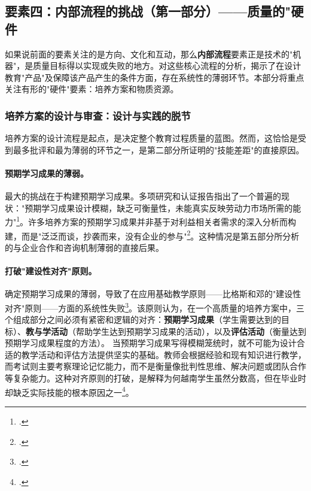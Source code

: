 


\subsection{要素四：内部流程的挑战（第一部分）——质量的"硬件}
\label{subsec:thach_thuc_quytringnoibo_hard}

如果说前面的要素关注的是方向、文化和互动，那么\textbf{内部流程}要素正是技术的"机器"，是质量目标得以实现或失败的地方。对这些核心流程的分析，揭示了在设计教育"产品"及保障该产品产生的条件方面，存在系统性的薄弱环节。本部分将重点关注有形的"硬件"要素：培养方案和物质资源。

\subsubsection{培养方案的设计与审查：设计与实践的脱节}

培养方案的设计流程是起点，是决定整个教育过程质量的蓝图。然而，这恰恰是受到最多批评和最为薄弱的环节之一，是第二部分所证明的"技能差距"的直接原因。

\paragraph{预期学习成果的薄弱。} 最大的挑战在于构建预期学习成果。多项研究和认证报告指出了一个普遍的现状："预期学习成果设计模糊，缺乏可衡量性，未能真实反映劳动力市场所需的能力"\footcite{vnujs_pam_2019}。许多培养方案的预期学习成果并非基于对利益相关者需求的深入分析而构建，而是"泛泛而谈，抄袭而来，没有企业的参与"\footcite{ijlter_elo_copy_2021}。这种情况是第五部分所分析的与企业合作和咨询机制薄弱的直接后果。

\paragraph{打破"建设性对齐"原则。} 确定预期学习成果的薄弱，导致了在应用基础教学原则——比格斯和邓的"建设性对齐"原则——方面的系统性失败\footcite{Biggs2011}。该原则认为，在一个高质量的培养方案中，三个组成部分之间必须有紧密和逻辑的对齐：\textbf{预期学习成果}（学生需要达到的目标）、\textbf{教与学活动}（帮助学生达到预期学习成果的活动），以及\textbf{评估活动}（衡量达到预期学习成果程度的方法）。
当预期学习成果写得模糊笼统时，就不可能为设计合适的教学活动和评估方法提供坚实的基础。教师会根据经验和现有知识进行教学，而考试则主要考察理论记忆能力，而不是衡量像批判性思维、解决问题或团队合作等复杂能力。这种对齐原则的打破，是解释为何越南学生虽然分数高，但在毕业时却缺乏实际技能的根本原因之一\footcite{csph_iqa_2023}。

